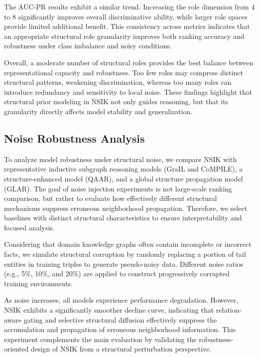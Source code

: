 \documentclass[preprint,12pt]{elsarticle}
\begin{document}
The AUC-PR results exhibit a similar trend. Increasing the role dimension from 4 to 8 significantly improves overall discriminative ability, while larger role spaces provide limited additional benefit. This consistency across metrics indicates that an appropriate structural role granularity improves both ranking accuracy and robustness under class imbalance and noisy conditions.

Overall, a moderate number of structural roles provides the best balance between representational capacity and robustness. Too few roles may compress distinct structural patterns, weakening discrimination, whereas too many roles can introduce redundancy and sensitivity to local noise. These findings highlight that structural prior modeling in NSIK not only guides reasoning, but that its granularity directly affects model stability and generalization.


\subsection{Noise Robustness Analysis}

To analyze model robustness under structural noise, we compare NSIK with representative inductive subgraph reasoning models (GraIL and CoMPILE), a structure-enhanced model (QAAR), and a global structure propagation model (GLAR). The goal of noise injection experiments is not large-scale ranking comparison, but rather to evaluate how effectively different structural mechanisms suppress erroneous neighborhood propagation. Therefore, we select baselines with distinct structural characteristics to ensure interpretability and focused analysis.

Considering that domain knowledge graphs often contain incomplete or incorrect facts, we simulate structural corruption by randomly replacing a portion of tail entities in training triples to generate pseudo-noisy data. Different noise ratios (e.g., 5\%, 10\%, and 20\%) are applied to construct progressively corrupted training environments.

As noise increases, all models experience performance degradation. However, NSIK exhibits a significantly smoother decline curve, indicating that relation-aware gating and selective structural diffusion effectively suppress the accumulation and propagation of erroneous neighborhood information. This experiment complements the main evaluation by validating the robustness-oriented design of NSIK from a structural perturbation perspective.
\end{document}
